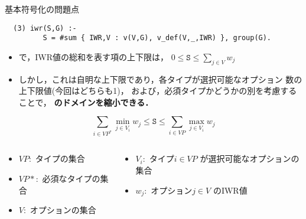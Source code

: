 \documentclass[dvipdfmx, 11pt]{beamer}
\begin{document}
\begin{frame}[fragile]{基本符号化の問題点}

\begin{exampleblock}{}\small
\begin{lstlisting}
  (3) iwr(S,G) :- 
         S = #sum { IWR,V : v(V,G), v_def(V,_,IWR) }, group(G).
\end{lstlisting}
\end{exampleblock}
\begin{itemize}
\item {}で，IWR値の総和を表す項の上下限は，
  \(
    0 \leq \texttt{S} \leq \sum_{j\in V}w_{j}
  \)
\item しかし，これは自明な上下限であり，各タイプが選択可能なオプション
  数の上下限値(今回はどちらも1)，
  および，必須タイプかどうかの別を考慮することで，
  \alert{\bf {}のドメインを縮小できる．}
\end{itemize}

\[
  \sum_{i\in VP^{*}}\min_{j\in V_{i}}w_{j}
  \leq \texttt{S} \leq
  \sum_{i\in VP}\max_{j\in V_{i}}w_{j}
\]

\begin{columns}\footnotesize
  \begin{column}{0.4\linewidth}
    \begin{itemize}
    \item $VP$:\ タイプの集合
    \item $VP*$:\ 必須なタイプの集合
    \item $V$:\ オプションの集合
    \end{itemize}
  \end{column}
  \begin{column}{0.45\linewidth}
    \begin{itemize}
    \item $V_i$:\ タイプ$i \in VP$ が選択可能なオプションの集合
    \item $w_j$:\ オプション$j \in V$ のIWR値
    \end{itemize}
  \end{column}
\end{columns}
\end{frame}
\end{document}
